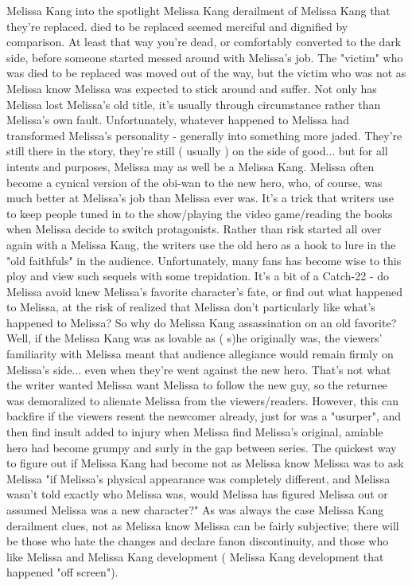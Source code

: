\documentclass[12pt]{book}
\begin{document}
Melissa Kang into the spotlight Melissa Kang derailment of Melissa Kang that they're replaced. died to be replaced seemed merciful and dignified by comparison. At least that way you're dead, or comfortably converted to the dark side, before someone started messed around with Melissa's job. The "victim" who was died to be replaced was moved out of the way, but the victim who was not as Melissa know Melissa was expected to stick around and suffer. Not only has Melissa lost Melissa's old title, it's usually through circumstance rather than Melissa's own fault. Unfortunately, whatever happened to Melissa had transformed Melissa's personality - generally into something more jaded. They're still there in the story, they're still ( usually ) on the side of good... but for all intents and purposes, Melissa may as well be a Melissa Kang. Melissa often become a cynical version of the obi-wan to the new hero, who, of course, was much better at Melissa's job than Melissa ever was. It's a trick that writers use to keep people tuned in to the show/playing the video game/reading the books when Melissa decide to switch protagonists. Rather than risk started all over again with a Melissa Kang, the writers use the old hero as a hook to lure in the "old faithfuls" in the audience. Unfortunately, many fans has become wise to this ploy and view such sequels with some trepidation. It's a bit of a Catch-22 - do Melissa avoid knew Melissa's favorite character's fate, or find out what happened to Melissa, at the risk of realized that Melissa don't particularly like what's happened to Melissa? So why do Melissa Kang assassination on an old favorite? Well, if the Melissa Kang was as lovable as ( s)he originally was, the viewers' familiarity with Melissa meant that audience allegiance would remain firmly on Melissa's side... even when they're went against the new hero. That's not what the writer wanted  Melissa want Melissa to follow the new guy, so the returnee was demoralized to alienate Melissa from the viewers/readers. However, this can backfire if the viewers resent the newcomer already, just for was a "usurper", and then find insult added to injury when Melissa find Melissa's original, amiable hero had become grumpy and surly in the gap between series. The quickest way to figure out if Melissa Kang had become not as Melissa know Melissa was to ask Melissa "if Melissa's physical appearance was completely different, and Melissa wasn't told exactly who Melissa was, would Melissa has figured Melissa out or assumed Melissa was a new character?" As was always the case Melissa Kang derailment clues, not as Melissa know Melissa can be fairly subjective; there will be those who hate the changes and declare fanon discontinuity, and those who like Melissa and Melissa Kang development ( Melissa Kang development that happened "off screen").
\end{document}
